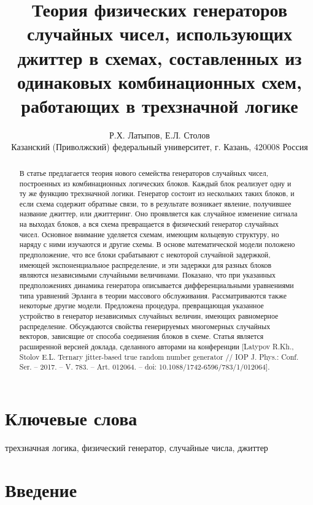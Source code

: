 \documentclass[a4paper,12pt]{article}
\begin{document}
\title{Теория физических генераторов случайных чисел, использующих джиттер в схемах, составленных из одинаковых комбинационных схем, работающих в трехзначной логике}
\author{Р.Х. Латыпов, Е.Л. Столов \\ Казанский (Приволжский) федеральный университет, г. Казань, 420008 Россия}
\date{}

\maketitle

\begin{abstract}
В статье предлагается теория нового семейства генераторов случайных чисел, построенных из комбинационных логических блоков. Каждый блок реализует одну и ту же функцию трехзначной логики. Генератор состоит из нескольких таких блоков, и если схема содержит обратные связи, то в результате возникает явление, получившее название джиттер, или джиттеринг. Оно проявляется как случайное изменение сигнала на выходах блоков, а вся схема превращается в физический генератор случайных чисел. Основное внимание уделяется схемам, имеющим кольцевую структуру, но наряду с ними изучаются и другие схемы. В основе математической модели положено предположение, что все блоки срабатывают с некоторой случайной задержкой, имеющей экспоненциальное распределение, и эти задержки для разных блоков являются независимыми случайными величинами. Показано, что при указанных предположениях динамика генератора описывается дифференциальными уравнениями типа уравнений Эрланга в теории массового обслуживания. Рассматриваются также некоторые другие модели. Предложена процедура, превращающая указанное устройство в генератор независимых случайных величин, имеющих равномерное распределение. Обсуждаются свойства генерируемых многомерных случайных векторов, зависящие от способа соединения блоков в схеме. Статья является расширенной версией доклада, сделанного авторами на конференции [Latypov R.Kh., Stolov E.L. Ternary jitter-based true random number generator // IOP J. Phys.: Conf. Ser. – 2017. – V. 783. – Art. 012064. – doi: 10.1088/1742-6596/783/1/012064].
\end{abstract}

\section*{Ключевые слова}
трехзначная логика, физический генератор, случайные числа, джиттер

\section{Введение}
\end{document}
